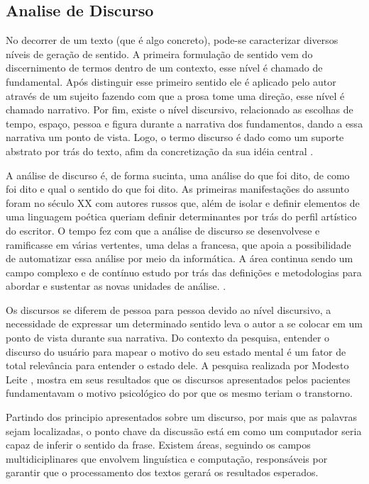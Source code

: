 \subsection{Analise de Discurso}
No decorrer de um texto (que é algo concreto), pode-se caracterizar diversos níveis de geração de sentido.
A primeira formulação de sentido vem do discernimento de termos dentro de um contexto, esse nível é chamado de fundamental. Após distinguir esse primeiro sentido ele é aplicado pelo autor através de um sujeito fazendo com que a prosa tome uma direção, esse nível é chamado narrativo. Por fim, existe o nível discursivo, relacionado as escolhas de tempo, espaço, pessoa e figura durante a narrativa dos fundamentos, dando a essa narrativa um ponto de vista. Logo, o termo discurso é dado como um suporte abstrato por trás do texto, afim da concretização da sua idéia central \cite[13-17]{gregolin1995ad}.

A análise de discurso é, de forma sucinta, uma análise do que foi dito, de como foi dito e qual o sentido do que foi dito. As primeiras manifestações do assunto foram no século XX com autores russos que, além de isolar e definir elementos de uma linguagem poética queriam definir determinantes por trás do perfil artístico do escritor. O tempo fez com que a análise de discurso se desenvolvese e ramificasse em várias vertentes, uma delas a francesa, que apoia a possibilidade de automatizar essa análise por meio da informática. A área continua sendo um campo complexo e de contínuo estudo por trás das definições e metodologias para abordar e sustentar as novas unidades de análise. \cite[22]{souza2006ad}.

Os discursos se diferem de pessoa para pessoa devido ao nível discursivo, a necessidade de expressar um determinado sentido leva o autor a se colocar em um ponto de vista durante sua narrativa. Do contexto da pesquisa, entender o discurso do usuário para mapear o motivo do seu estado mental é um fator de total relevância para entender o estado dele. A pesquisa realizada por Modesto Leite \cite[134]{modesto2005adepre}, mostra em seus resultados que os discursos apresentados pelos pacientes fundamentavam o motivo psicológico do por que os mesmo teriam o transtorno. 

Partindo dos principio apresentados sobre um discurso, por mais que as palavras sejam localizadas, o ponto chave da discussão está em como um computador seria capaz de inferir o sentido da frase. Existem áreas, seguindo os campos multidiciplinares que envolvem linguística e computação, responsáveis por garantir que o processamento dos textos gerará os resultados esperados.
